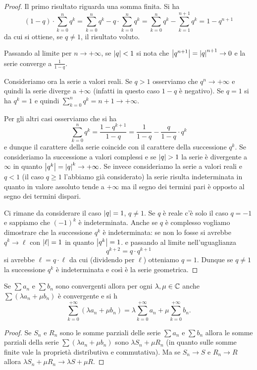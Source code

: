 \begin{proof}
Il primo risultato riguarda una somma finita.
Si ha
\[
  (1-q)\cdot \sum_{k=0}^n q^k
  = \sum_{k=0}^n q^k - q \cdot \sum_{k=0}^n q^k
  = \sum_{k=0}^n q^k - \sum_{k=1}^{n+1} q^k
  = 1 - q^{n+1}
\]
da cui si ottiene, se $q\neq 1$, il risultato voluto.

Passando al limite per $n\to +\infty$, se ${\left|q\right|} < 1 $
si nota che ${\left|q^{n+1}\right|} = {\left|q\right|}^{n+1} \to 0$
e la serie converge a $\frac 1{1-q}$.

Consideriamo ora la serie a valori reali.
Se $q>1$ osserviamo che
$q^n\to +\infty$ e quindi la serie diverge a $+\infty$
(infatti in questo caso $1-q$ è negativo).
Se $q=1$ si ha $q^k=1$ e quindi
$\displaystyle\sum_{k=0}^n q^k = n+1 \to +\infty$.

Per gli altri casi osserviamo che si ha
\[
  \sum_{k=0}^n q^k = \frac{1-q^{k+1}}{1-q}
  = \frac{1}{1-q} - \frac{q}{1-q}\cdot q^k
\]
e dunque il carattere della serie coincide
con il carattere della successione $q^k$.
Se consideriamo la successione a valori
complessi e se ${\left|q\right|}>1$ la serie è divergente
a $\infty$ in quanto
${\left|q^k\right|}={\left|q\right|}^k\to +\infty$.
Se invece consideriamo la serie a valori reali
e $q<1$ (il caso $q\ge 1$ l'abbiamo già considerato)
la serie risulta indeterminata in quanto
in valore assoluto tende a $+\infty$ ma
il segno dei termini pari è opposto al segno dei termini
dispari.

Ci rimane da considerare il caso ${\left|q\right|}=1$, $q\neq 1$.
Se $q$ è reale c'è solo il caso $q=-1$ e sappiamo
che $(-1)^k$ è indeterminata.
Anche se $q$ è complesso vogliamo dimostrare
che la successione $q^k$ è indeterminata:
se non lo fosse si avrebbe $q^k\to \ell$
con ${\left|\ell\right|}=1$ in quanto ${\left|q^k\right|}=1$.
e passando al limite nell'uguaglianza
\[
  q^{k+2} = q\cdot q^{k+1}
\]
si avrebbe $\ell = q\cdot \ell$ da cui
(dividendo per $\ell$) otteniamo $q=1$.
Dunque se $q\neq 1$ la successione $q^k$
è indeterminata e così è la serie
geometrica.
\end{proof}

\begin{theorem}
Se $\sum a_n$ e $\sum b_n$ sono convergenti
allora per ogni $\lambda,\mu\in \mathbb C$
anche $\sum (\lambda a_n + \mu b_n)$ è convergente
e si h
\[
 \sum_{k=0}^{+\infty} (\lambda a_n + \mu b_n)
 = \lambda \sum_{k=0}^{+\infty} a_n  + \mu \sum_{k=0}^{+\infty} b_n.
\]
\end{theorem}
%
\begin{proof}
Se $S_n$ e $R_n$ sono le somme parziali delle serie $\sum a_n$ e $\sum b_n$
allora le somme parziali della serie $\sum (\lambda a_n + \mu b_n)$ sono
$\lambda S_n + \mu R_n$ (in quanto sulle somme finite vale la proprietà distributiva e commutativa). Ma se $S_n \to S$ e $R_n \to R$ allora
$\lambda S_n + \mu R_n \to \lambda S + \mu R$.
\end{proof}

